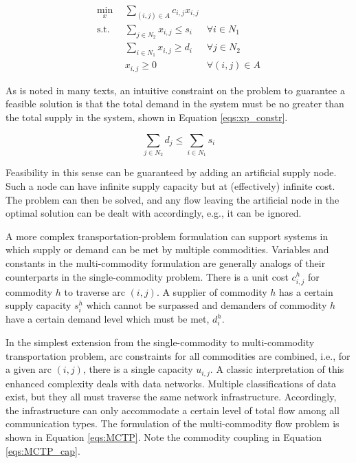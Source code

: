 \begin{subequations}\label{eqs:xport}
  \begin{align}
    \min_{x} \:\: & 
    \sum_{(i, j) \in A} c_{i,j} x_{i,j}
    & \label{eqs:xport_obj} \\
    \text{s.t.} \:\: &
    \sum_{j \in N_2} x_{i,j} \leq s_i
    & \forall i \in N_1  \\
    &
    \sum_{i \in N_1} x_{i,j} \geq d_i
    & \forall j \in N_2  \\
    &
    x_{i,j} \geq 0
    & \forall (i, j) \in A \label{eqs:xport_x}
  \end{align}
\end{subequations}

As is noted in many texts, an intuitive constraint on the problem to guarantee a
feasible solution is that the total demand in the system must be no greater than
the total supply in the system, shown in Equation \ref{eqs:xp_constr}.

\begin{equation}\label{eqs:xp_constr}
  \sum_{j \in N_2} d_j \leq \sum_{i \in N_1} s_i
\end{equation}

\noindent
Feasibility in this sense can be guaranteed by adding an artificial supply
node. Such a node can have infinite supply capacity but at (effectively)
infinite cost. The problem can then be solved, and any flow leaving the
artificial node in the optimal solution can be dealt with accordingly, e.g., it
can be ignored.

A more complex transportation-problem formulation can support systems in which
supply or demand can be met by multiple commodities.  Variables and constants in
the multi-commodity formulation are generally analogs of their counterparts in
the single-commodity problem. There is a unit cost $c_{i,j}^{h}$ for commodity
$h$ to traverse arc $(i,j)$. A supplier of commodity $h$ has a certain supply
capacity $s_i^h$ which cannot be surpassed and demanders of commodity $h$ have a
certain demand level which must be met, $d_i^h$.

In the simplest extension from the single-commodity to multi-commodity
transportation problem, arc constraints for all commodities are combined, i.e.,
for a given arc $(i, j)$, there is a single capacity $u_{i,j}$. A classic
interpretation of this enhanced complexity deals with data networks. Multiple
classifications of data exist, but they all must traverse the same network
infrastructure. Accordingly, the infrastructure can only accommodate a certain
level of total flow among all communication types. The formulation of the
multi-commodity flow problem is shown in Equation \ref{eqs:MCTP}. Note the
commodity coupling in Equation \ref{eqs:MCTP_cap}.

